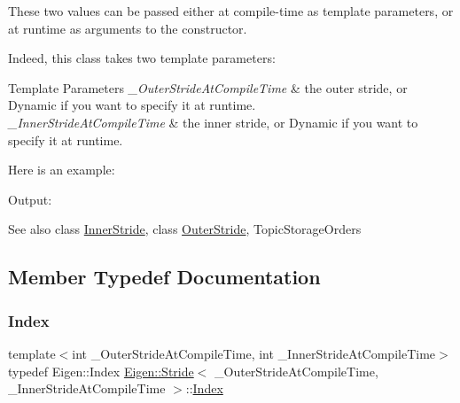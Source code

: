 These two values can be passed either at compile-\/time as template parameters, or at runtime as arguments to the constructor.

Indeed, this class takes two template parameters\+: 
\begin{DoxyTemplParams}{Template Parameters}
{\em \+\_\+\+Outer\+Stride\+At\+Compile\+Time} & the outer stride, or Dynamic if you want to specify it at runtime. \\
\hline
{\em \+\_\+\+Inner\+Stride\+At\+Compile\+Time} & the inner stride, or Dynamic if you want to specify it at runtime.\\
\hline
\end{DoxyTemplParams}
Here is an example\+: 
\begin{DoxyCodeInclude}{0}
\end{DoxyCodeInclude}
 Output\+: 
\begin{DoxyVerbInclude}
\end{DoxyVerbInclude}


\begin{DoxySeeAlso}{See also}
class \mbox{\hyperlink{class_eigen_1_1_inner_stride}{Inner\+Stride}}, class \mbox{\hyperlink{class_eigen_1_1_outer_stride}{Outer\+Stride}}, Topic\+Storage\+Orders 
\end{DoxySeeAlso}


\subsection{Member Typedef Documentation}
\mbox{\label{class_eigen_1_1_stride_a96c2dfb0ce43fd8e19adcdf6094f5f63}} 
\subsubsection{\texorpdfstring{Index}{Index}}
{\footnotesize\ttfamily template$<$int \+\_\+\+Outer\+Stride\+At\+Compile\+Time, int \+\_\+\+Inner\+Stride\+At\+Compile\+Time$>$ \\
typedef Eigen\+::\+Index \mbox{\hyperlink{class_eigen_1_1_stride}{Eigen\+::\+Stride}}$<$ \+\_\+\+Outer\+Stride\+At\+Compile\+Time, \+\_\+\+Inner\+Stride\+At\+Compile\+Time $>$\+::\mbox{\hyperlink{class_eigen_1_1_stride_a96c2dfb0ce43fd8e19adcdf6094f5f63}{Index}}}

